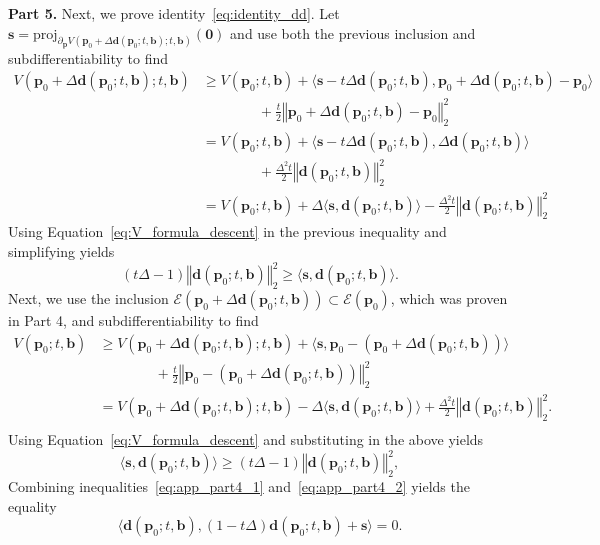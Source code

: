 \documentclass[11pt]{article}
\numberwithin{prop}{section}
\numberwithin{lem}{section}
\numberwithin{rem}{section}
\numberwithin{cor}{section}
\numberwithin{thm}{section}
\numberwithin{defn}{section}
\numberwithin{fact}{section}
\theoremstyle{plain}
\def\bb {\boldsymbol{b}}
\def\bd {\boldsymbol{d}}
\def\bp {\boldsymbol{p}}
\def\bs {\boldsymbol{s}}
\newcommand{\normsq}[1]{\left\Vert{#1} \right\Vert_{2}^{2}}
\def\proj {\mathrm{proj}}
\def\bpo {\bp_{0}}
\def\epo {\mathcal{E}(\bp_{0})}
\begin{document}
\noindent
\newline
\textbf{Part 5.} Next, we prove identity~\eqref{eq:identity_dd}. Let $\bs = \proj_{\partial_{\bp}V(\bpo+\Delta\bd(\bpo;t,\bb);t,\bb)}(\boldsymbol{0})$ and use both the previous inclusion and subdifferentiability to find
\[
\begin{alignedat}{1}
V(\bpo + \Delta\bd(\bpo;t,\bb);t,\bb) &\geqslant V(\bpo;t,\bb) + \langle\bs - t \Delta\bd(\bpo;t,\bb),\bpo + \Delta\bd(\bpo;t,\bb)-\bpo\rangle\\
&\qquad\qquad  + \frac{t}{2}\normsq{\bpo + \Delta\bd(\bpo;t,\bb) - \bpo} \\
&= V(\bpo;t,\bb) + \langle\bs - t \Delta\bd(\bpo;t,\bb), \Delta\bd(\bpo;t,\bb)\rangle \\
&\qquad\qquad  + \frac{\Delta^2t}{2}\normsq{\bd(\bpo;t,\bb)} \\
&= V(\bpo;t,\bb) + \Delta \langle\bs, \bd(\bpo;t,\bb)\rangle - \frac{\Delta^2t}{2}\normsq{\bd(\bpo;t,\bb)}
\end{alignedat}
\]
Using Equation~\eqref{eq:V_formula_descent} in the previous inequality and simplifying yields
\begin{equation}\label{eq:app_part4_1}
(t \Delta - 1)\normsq{\bd(\bpo;t,\bb)} \geqslant \langle\bs,\bd(\bpo;t,\bb)\rangle.
\end{equation}
Next, we use the inclusion $\mathcal{E}(\bpo + \Delta\bd(\bpo;t,\bb)) \subset \epo$, which was proven in Part 4, and subdifferentiability to find
\[
\begin{alignedat}{1}
V(\bpo;t,\bb) &\geqslant V(\bpo + \Delta\bd(\bpo;t,\bb);t,\bb) + \langle\bs,\bpo - (\bpo + \Delta\bd(\bpo;t,\bb)) \rangle \\
&\qquad \qquad + \frac{t}{2}\normsq{\bpo - (\bpo + \Delta\bd(\bpo;t,\bb))}\\
&= V(\bpo + \Delta\bd(\bpo;t,\bb);t,\bb) -\Delta\langle\bs,\bd(\bpo;t,\bb) \rangle + \frac{\Delta^{2}t}{2}\normsq{\bd(\bpo;t,\bb)}.\\
\end{alignedat}
\]
Using Equation~\eqref{eq:V_formula_descent} and substituting in the above yields
\begin{equation}\label{eq:app_part4_2}
\langle\bs,\bd(\bpo;t,\bb) \rangle \geqslant (t \Delta - 1)\normsq{\bd(\bpo;t,\bb)},
\end{equation}
Combining inequalities~\eqref{eq:app_part4_1} and~\eqref{eq:app_part4_2} yields the equality
\begin{equation}\label{eq:app_part4_3}
\langle\bd(\bpo;t,\bb),(1-t \Delta)\bd(\bpo;t,\bb) + \bs\rangle = 0.
\end{equation}
\end{document}
